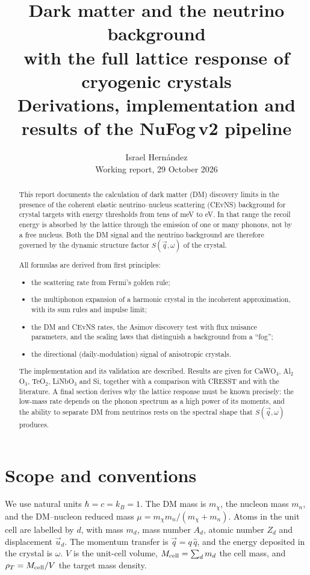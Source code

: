 \documentclass[11pt,a4paper]{article}
\title{\textbf{Dark matter and the neutrino background\\ with the full lattice response of cryogenic crystals}\\[4pt]
\large Derivations, implementation and results of the NuFog\,v2 pipeline}
\author{Israel Hern\'andez\\ \small Working report, 29 October 2026}
\date{}
\numberwithin{equation}{section}
\newcommand{\qv}{\vec q}
\newcommand{\qh}{\hat q}
\newcommand{\mchi}{m_\chi}
\begin{document}
\maketitle

\begin{abstract}
\noindent
This report documents the calculation of dark matter (DM) discovery limits in the presence of
the coherent elastic neutrino--nucleus scattering (CEvNS) background for crystal targets with
energy thresholds from tens of meV to eV. In that range the recoil energy is absorbed by the
lattice through the emission of one or many phonons, not by a free nucleus. Both the DM signal
and the neutrino background are therefore governed by the dynamic structure factor
$S(\vec q,\omega)$ of the crystal.

All formulas are derived from first principles:
\begin{itemize}
  \item the scattering rate from Fermi's golden rule;
  \item the multiphonon expansion of a harmonic crystal in the incoherent approximation,
  with its sum rules and impulse limit;
  \item the DM and CEvNS rates, the Asimov discovery test with flux nuisance parameters, and
  the scaling laws that distinguish a background from a ``fog'';
  \item the directional (daily-modulation) signal of anisotropic crystals.
\end{itemize}

The implementation and its validation are described. Results are given for CaWO$_4$,
Al$_2$O$_3$, TeO$_2$, LiNbO$_3$ and Si, together with a comparison with CRESST and with the
literature. A final section derives why the lattice response must be known precisely: the
low-mass rate depends on the phonon spectrum as a high power of its moments, and the ability
to separate DM from neutrinos rests on the spectral shape that $S(\vec q,\omega)$ produces.
\end{abstract}

\tableofcontents
\newpage

\section{Scope and conventions}
We use natural units $\hbar=c=k_B=1$. The DM mass is $\mchi$, the nucleon mass $m_n$, and the
DM--nucleon reduced mass $\mu=\mchi m_n/(\mchi+m_n)$. Atoms in the unit cell are labelled by
$d$, with mass $m_d$, mass number $A_d$, atomic number $Z_d$ and displacement $\vec u_d$.
The momentum transfer is $\qv=q\,\qh$, and the energy deposited in the crystal is $\omega$.
$V$ is the unit-cell volume, $M_{\rm cell}=\sum_d m_d$ the cell mass, and
$\rho_T=M_{\rm cell}/V$ the target mass density.
\end{document}
